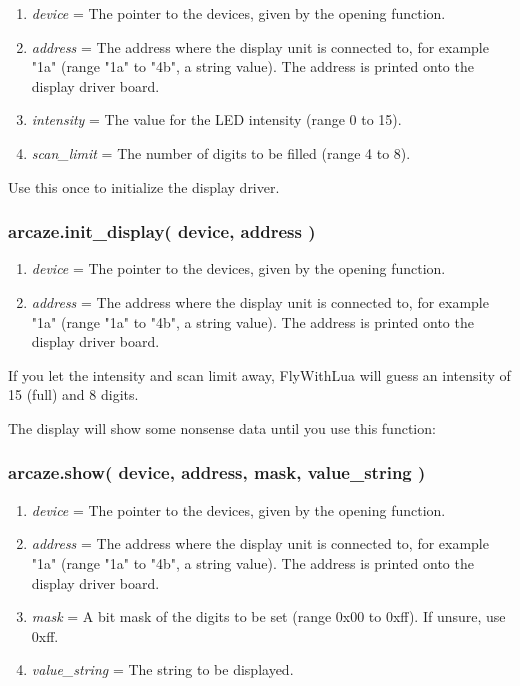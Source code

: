 \documentclass[11pt,parskip=half,a4paper]{scrartcl}
\begin{document}
\begin{enumerate}
\item \emph{device} = The pointer to the devices, given by the opening function.
\item \emph{address} = The address where the display unit is connected to, for example "1a" (range "1a" to "4b", a string value). The address is printed onto the display driver board.
\item \emph{intensity} = The value for the LED intensity (range 0 to 15).
\item \emph{scan\_limit} = The number of digits to be filled (range 4 to 8).
\end{enumerate}

Use this once to initialize the display driver.

\subsubsection{arcaze.init\_display( device, address )}

\begin{enumerate}
\item \emph{device} = The pointer to the devices, given by the opening function.
\item \emph{address} = The address where the display unit is connected to, for example "1a" (range "1a" to "4b", a string value). The address is printed onto the display driver board.
\end{enumerate}

If you let the intensity and scan limit away, FlyWithLua will guess an intensity of 15 (full) and 8 digits.

The display will show some nonsense data until you use this function:


\subsubsection{arcaze.show( device, address, mask, value\_string )}

\begin{enumerate}
\item \emph{device} = The pointer to the devices, given by the opening function.
\item \emph{address} = The address where the display unit is connected to, for example "1a" (range "1a" to "4b", a string value). The address is printed onto the display driver board.
\item \emph{mask} = A bit mask of the digits to be set (range 0x00 to 0xff). If unsure, use 0xff.
\item \emph{value\_string} = The string to be displayed.
\end{enumerate}
\end{document}
